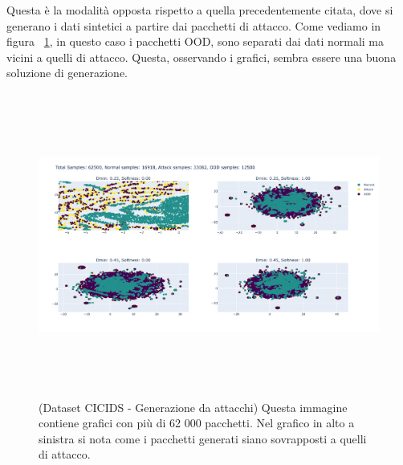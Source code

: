 Questa è la modalità opposta rispetto a quella precedentemente citata, dove si generano i dati sintetici a partire dai pacchetti di attacco. Come vediamo in figura ~\ref{fig:gen_CICIDS_attack_1}, in questo caso i pacchetti OOD, sono separati dai dati normali ma vicini a quelli di attacco. Questa, osservando i grafici, sembra essere una buona soluzione di generazione.
\begin{figure}[htpb]
    \centering
    \includegraphics[width=\textwidth,height=10cm,keepaspectratio=true]{img/gen_test/cicids/CICIDS18_attack_only_12k.png}
    \caption{
      (Dataset CICIDS - Generazione da attacchi) Questa immagine contiene grafici con più di 62 000 pacchetti. Nel grafico in alto a sinistra si nota come i pacchetti generati siano sovrapposti a quelli di attacco.
    }
    \label{fig:gen_CICIDS_attack_1}
\end{figure}

